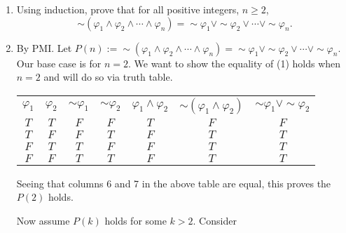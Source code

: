 \documentclass[12pt]{article}
\makeatletter
\theoremstyle{definition}
\theoremstyle{remark}
\renewenvironment{proof}[1][\proofname]{\par
  \pushQED{\qed}%
  \normalfont \topsep6\p@\@plus6\p@\relax
  \list{}{\leftmargin=0mm
          \rightmargin=4mm
          \settowidth{\itemindent}{\itshape#1}%
          \labelwidth=\itemindent
          \parsep=0pt \listparindent=\parindent 
  }
  \item[\hskip\labelsep
        \itshape
    #1\@addpunct{.}]\ignorespaces
}{%
  \popQED\endlist\@endpefalse
}
\let\oldproofname=\proofname
\renewcommand{\proofname}{\bf{\textit{\oldproofname}}}
\makeatother
\begin{document}
\begin{enumerate}[leftmargin=*]
        \item Using induction, prove that for all positive integers, $n\geq 2$,
            \begin{equation}
                \sim(\varphi_1\land\varphi_2\land\cdots\land\varphi_n)=\sim\varphi_1\lor\sim\varphi_2\lor\cdots\lor\sim\varphi_n.
            \end{equation}
            \begin{proof}
                By PMI. Let $P(n):=\sim(\varphi_1\land\varphi_2\land\cdots\land\varphi_n)=\sim\varphi_1\lor\sim\varphi_2\lor\cdots\lor\sim\varphi_n$. Our base case is for $n=2$. We want to show the equality of (1) holds when $n=2$ and will do so via truth table.
                    \begin{landscape}
                        \begin{table}[htp]
                            \centering
                            \begin{tabular}{c|c|c|c|c|c|c|}
                                \cline{1-7}
                                \multicolumn{1}{|l|}{$\varphi_1$} & $\varphi_2$ & $\sim\varphi_1$ & $\sim\varphi_2$ & $\varphi_1\land\varphi_2$ & $\sim(\varphi_1\land\varphi_2)$ & $\sim\varphi_1\lor\sim\varphi_2$   \\ \cline{1-7}
                                \multicolumn{1}{|c|}{$T$} & $T$ & $F$ & $F$ & $T$ & $F$ & $F$  \\ \cline{1-7}
                                \multicolumn{1}{|c|}{$T$} & $F$ & $F$ & $T$ & $F$ & $T$ & $T$  \\ \cline{1-7}
                                \multicolumn{1}{|c|}{$F$} & $T$ & $T$ & $F$ & $F$ & $T$ & $T$  \\ \cline{1-7}
                                \multicolumn{1}{|c|}{$F$} & $F$ & $T$ & $T$ & $F$ & $T$ & $T$  \\ \cline{1-7}
                            \end{tabular}
                        \end{table}
                    \end{landscape}\hfill\par
                Seeing that columns 6 and 7 in the above table are equal, this proves the $P(2)$ holds.\par\hspace{4mm} Now assume $P(k)$ holds for some $k>2$. Consider
                    \begin{equation*}
                        \begin{split}

\end{split}
\end{equation*}
\end{proof}
\end{enumerate}
\end{document}
